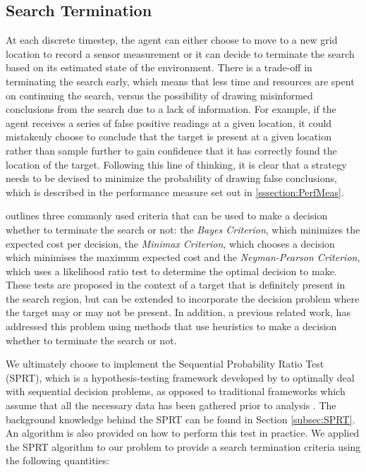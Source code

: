 
\subsection{Search Termination}\label{subsubsec:SeachTerminationMethodology}

At each discrete timestep, the agent can either choose to move to a new grid location to record a sensor measurement or it can decide to terminate the search based on its estimated state of the environment. There is a trade-off in terminating the search early, which means that less time and resources are spent on continuing the search, versus the possibility of drawing misinformed conclusions from the search due to a lack of information. For example, if the agent receives a series of false positive readings at a given location, it could mistakenly choose to conclude that the target is present at a given location rather than sample further to gain confidence that it has correctly found the location of the target. Following this line of thinking, it is clear that a strategy needs to be devised to minimize the probability of drawing false conclusions, which is described in the performance measure set out in \ref{sssection:PerfMeas}.\par
\cite{Pollock1971SearchInterfaces} outlines three commonly used criteria that can be used to make a decision whether to terminate the search or not: the \textit{Bayes Criterion}, which minimizes the expected cost per decision, the \textit{Minimax Criterion}, which chooses a decision which minimises the maximum expected cost and the \textit{Neyman-Pearson Criterion}, which uses a likelihood ratio test to determine the optimal decision to make. These tests are proposed in the context of a target that is definitely present in the search region, but can be extended to incorporate the decision problem where the target may or may not be present. In addition, a previous related work, \cite{Chung2007ASearchb} has addressed this problem using methods that use heuristics to make a decision whether to terminate the search or not. 

We ultimately choose to implement the Sequential Probability Ratio Test (SPRT), which is a hypothesis-testing framework developed by \citeauthor{Wald1950BayesProblems} to optimally deal with sequential decision problems, as opposed to traditional frameworks which assume that all the necessary data has been gathered prior to analysis \cite{Wald1950BayesProblems}. The background knowledge behind the SPRT can be found in Section \ref{subsec:SPRT}. An algorithm is also provided on how to perform this test in practice.
We applied the SPRT algorithm to our problem to provide a search termination criteria using the following quantities: 

